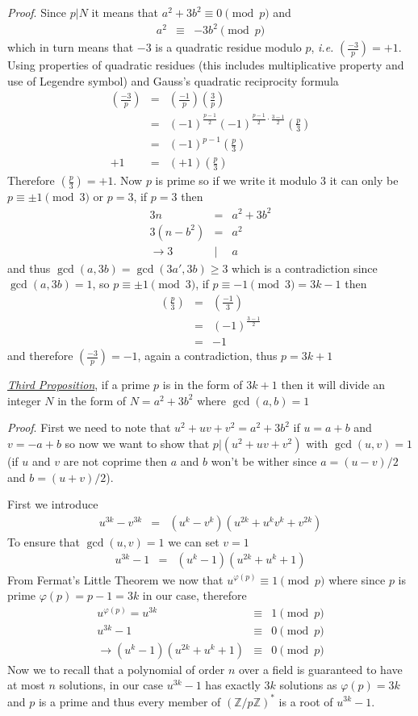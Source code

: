 \documentclass[aps,preprint,preprintnumbers,nofootinbib,showpacs,prd]{revtex4-1}
\newcommand{\ie}{{\it i.e.} }
\newcommand{\nbea}{\begin{eqnarray*}}
\newcommand{\neea}{\end{eqnarray*}}
\begin{document}
{\it Proof}. Since $p|N$ it means that $a^2 + 3b^2 \equiv 0 \pmod{p}$ and
%
\nbea
a^2 & \equiv & -3b^2 \pmod{p}
\neea
%
which in turn means that $-3$ is a quadratic residue modulo $p$, \ie $\left ( \frac{-3}{p} \right ) = +1$. Using properties of quadratic residues (this includes multiplicative property and use of Legendre symbol) and Gauss's quadratic reciprocity formula
%
\nbea
\left ( \frac{-3}{p} \right ) & = & \left ( \frac{-1}{p} \right ) \left ( \frac{3}{p} \right ) \\
& = & (-1)^{\frac{p-1}{2}} (-1)^{\frac{p-1}{2}\cdot\frac{3-1}{2}}\left ( \frac{p}{3} \right ) \\
& = & (-1)^{p-1}\left ( \frac{p}{3} \right ) \\
+1 & = & (+1)\left ( \frac{p}{3} \right )
\neea
%
Therefore $\left ( \frac{p}{3} \right ) = +1$. Now $p$ is prime so if we write it modulo $3$ it can only be $ p \equiv \pm 1 \pmod{3}$ or $p = 3$, if $p = 3$ then
%
\nbea
3n & = & a^2 + 3b^2 \\
3 (n - b^2) & = & a^2 \\
\to 3 &|& a
\neea
%
and thus $\gcd(a,3b) = \gcd(3a',3b) \ge 3$ which is a contradiction since $\gcd(a,3b) = 1$, so $p \equiv \pm1 \pmod{3}$, if $p \equiv -1 \pmod{3} = 3k - 1$ then
%
\nbea
\left ( \frac{p}{3} \right ) & = & \left ( \frac{-1}{3} \right ) \\
& = & (-1)^{\frac{3-1}{2}} \\
& = & -1
\neea
%
and therefore $\left ( \frac{-3}{p} \right ) = -1$, again a contradiction, thus $p = 3k + 1$

\underline{\it Third Proposition}, if a prime $p$ is in the form of $3k + 1$ then it will divide an integer $N$ in the form of $N = a^2 + 3b^2$ where $\gcd(a,b) = 1$

{\it Proof}. First we need to note that $u^2 + uv + v^2 = a^2 + 3b^2$ if $u = a+b$ and $v = -a+b$ so now we want to show that $p|(u^2 + uv + v^2)$ with $\gcd(u,v)=1$ (if $u$ and $v$ are not coprime then $a$ and $b$ won't be wither since $a = (u-v)/2$ and $b = (u+v)/2$).

First we introduce
%
\nbea
u^{3k} - v^{3k} & = & (u^k - v^k)(u^{2k} + u^kv^k + v^{2k})
\neea
%
To ensure that $\gcd(u,v)=1$ we can set $v = 1$
%
\nbea
u^{3k} - 1 & = & (u^k - 1)(u^{2k} + u^k + 1)
\neea
%
From Fermat's Little Theorem we now that $u^{\varphi(p)} \equiv 1 \pmod{p}$ where since $p$ is prime $\varphi(p) = p -1 = 3k$ in our case, therefore
%
\nbea
u^{\varphi(p)} = u^{3k} & \equiv & 1 \pmod{p} \\
u^{3k} - 1 & \equiv & 0 \pmod{p} \\
\to (u^k - 1)(u^{2k} + u^k + 1) & \equiv & 0 \pmod{p}
\neea
%
Now we to recall that a polynomial of order $n$ over a field is guaranteed to have at most $n$ solutions, in our case $u^{3k} - 1$ has exactly $3k$ solutions as $\varphi(p) = 3k$ and $p$ is a prime and thus every member of $(\mathbb{Z}/p\mathbb{Z})^*$ is a root of $u^{3k} - 1$.
\end{document}
